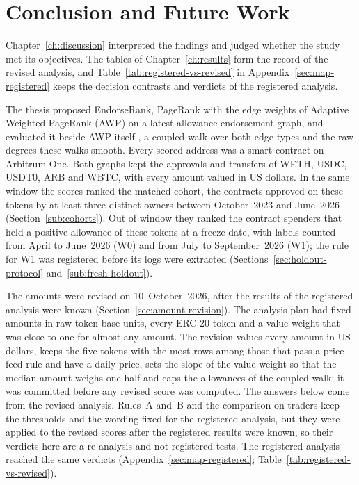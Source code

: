 \chapter{Conclusion and Future Work}
\label{ch:conclusion}

Chapter~\ref{ch:discussion} interpreted the findings and judged whether the study met its objectives. The tables of Chapter~\ref{ch:results} form the record of the revised analysis, and Table~\ref{tab:registered-vs-revised} in Appendix~\ref{sec:map-registered} keeps the decision contrasts and verdicts of the registered analysis.


The thesis proposed EndorseRank, PageRank with the edge weights of Adaptive Weighted PageRank (AWP) on a latest-allowance endorsement graph, and evaluated it beside AWP itself \parencite{do2023awp}, a coupled walk over both edge types and the raw degrees these walks smooth. Every scored address was a smart contract on Arbitrum One. Both graphs kept the approvals and transfers of WETH, USDC, USDT0, ARB and WBTC, with every amount valued in US dollars. In the same window the scores ranked the matched cohort, the contracts approved on these tokens by at least three distinct owners between October~2023 and June~2026 (Section~\ref{sub:cohorts}). Out of window they ranked the contract spenders that held a positive allowance of these tokens at a freeze date, with labels counted from April to June~2026 (W0) and from July to September~2026 (W1); the rule for W1 was registered before its logs were extracted (Sections~\ref{sec:holdout-protocol} and~\ref{sub:fresh-holdout}).

The amounts were revised on 10~October~2026, after the results of the registered analysis were known (Section~\ref{sec:amount-revision}). The analysis plan had fixed amounts in raw token base units, every ERC-20 token and a value weight that was close to one for almost any amount. The revision values every amount in US dollars, keeps the five tokens with the most rows among those that pass a price-feed rule and have a daily price, sets the slope of the value weight so that the median amount weighs one half and caps the allowances of the coupled walk; it was committed before any revised score was computed. The answers below come from the revised analysis. Rules~A and~B and the comparison on traders keep the thresholds and the wording fixed for the registered analysis, but they were applied to the revised scores after the registered results were known, so their verdicts here are a re-analysis and not registered tests. The registered analysis reached the same verdicts (Appendix~\ref{sec:map-registered}; Table~\ref{tab:registered-vs-revised}).

